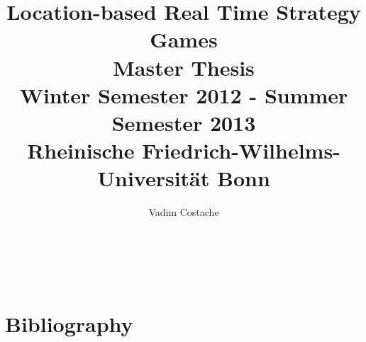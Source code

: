 \documentclass{article}
\title{Location-based Real Time Strategy Games \\ Master Thesis \\ Winter
Semester 2012 - Summer Semester 2013 \\ Rheinische
Friedrich-Wilhelms-Universit\"at Bonn}
\author{Vadim Costache} %
\begin{document}
\maketitle %

\setlength\parindent{0pt} %

\renewcommand{\labelenumi}{\alph{enumi}.} %

\newcommand{\superscript}[1]{\ensuremath{^{\textrm{#1}}}}
\newcommand{\subscript}[1]{\ensuremath{_{\textrm{#1}}}}



   
\begin{verbatim}



\end{verbatim}
     
\tableofcontents

\newpage


















\begin{appendices}








\end{appendices}









\section{Bibliography}
		
	




\end{document}
